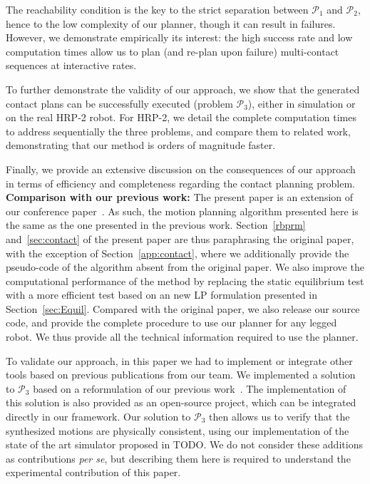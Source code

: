 The reachability condition is the key to the strict separation between $\mathcal{P}_1$ and $\mathcal{P}_2$, hence to the low complexity of our planner, though it
can result in failures. However, we demonstrate empirically its interest: the high success rate and low computation times allow us to plan (and re-plan upon failure) multi-contact sequences at \gls{interactive} rates.

To further demonstrate the validity of our approach, we show that the generated contact plans  can be successfully executed (problem  $\mathcal{P}_3$), either in simulation or on the real HRP-2 robot. For HRP-2, we detail the complete computation times to address sequentially the three problems, and compare them to related work, demonstrating that our method is orders of magnitude faster.

Finally, we provide an extensive discussion on the consequences of our approach in terms of efficiency and completeness regarding the contact planning problem. \\

\noindent \textbf{Comparison with our previous work:}
The present paper is an extension of our conference paper~\cite{tonneauisrr15}. As such, the motion planning algorithm presented here is the same as the one presented in the
previous work. Section~\ref{rbprm} and~\ref{sec:contact} of the present paper are thus paraphrasing the original paper, with the exception of Section~\ref{app:contact}, where we additionally provide the pseudo-code of the algorithm absent from the original paper. We also improve the computational performance of the method by replacing the static equilibrium test with a more efficient test based on an new LP formulation presented in Section~\ref{sec:Equil}.
Compared with the original paper, we also release our source code, and provide the complete procedure to use our planner for any legged robot. We thus provide
all the technical information required to use the planner.

To validate our approach, in this paper we had to implement or integrate other tools based on previous publications from our team. We implemented a solution to $\mathcal{P}_3$ based on a reformulation of our previous work~\cite{Carpentier2016}. The implementation of this solution is also provided as an open-source project, which can be integrated directly in our framework. Our solution to $\mathcal{P}_3$ then allows us to verify that the synthesized motions are physically consistent, using our implementation of the state of the art simulator proposed in TODO.
We do not consider these additions as contributions \textit{per se}, but describing them here is required to understand the experimental contribution of this paper.

